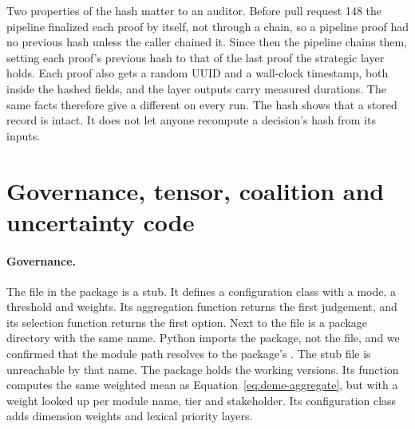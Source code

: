 Two properties of the hash matter to an auditor. Before pull request 148 the pipeline finalized
each proof by itself, not through a chain, so a pipeline proof had no previous hash unless the
caller chained it. Since then the pipeline chains them, setting each proof's
previous hash to that of the last proof the strategic layer holds.
Each proof also gets a random UUID and a wall-clock timestamp, both inside the hashed fields,
and the layer outputs carry measured durations. The same facts therefore give a different
 on every run. The hash shows that a stored record is intact. It does not let
anyone recompute a decision's hash from its inputs.

\section{Governance, tensor, coalition and uncertainty code}\label{sec:deme-v3}

\paragraph{Governance.} The file  in the  package is a stub. It
defines a configuration class with a mode, a threshold and weights. Its aggregation function
returns the first judgement, and its selection function returns the first option. Next to the
file is a package directory with the same name. Python imports the package, not the file, and we
confirmed that the module path  resolves to the package's
. The stub file is unreachable by that name. The package holds the working
versions. Its function  computes the same weighted mean as
Equation~\eqref{eq:deme-aggregate}, but with a weight looked up per module name, tier and
stakeholder. Its configuration class  adds dimension weights and lexical
priority layers.

